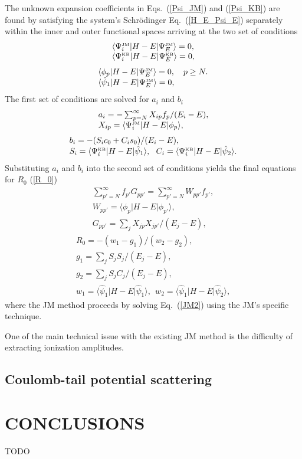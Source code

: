 \documentclass[aip
, pra
, showpacs
, aps
, twocolumn
, groupedaddress
, floatfix
]{revtex4}
\newcommand{\beq}{\begin{equation}}
\newcommand{\eeq}{\end{equation}}
\newcommand{\barr}{\begin{array}}
\newcommand{\earr}{\end{array}}
\newcommand{\JM}{\mbox{\tiny{JM}}}
\newcommand{\KB}{\mbox{\tiny{KB}}}
\begin{document}
The unknown expansion coefficients in Eqs.~(\ref{Psi_JM}) and (\ref{Psi_KB}) 
are found by satisfying the system's  Schr\"odinger Eq.~(\ref{H_E_Psi_E}) 
separately within the inner and outer functional spaces
arriving at the two set of conditions 
\beq \barr{l}
\langle\Psi_i^{\JM}|H-E|\Psi_E^{\JM}\rangle= 0, \\
\langle\Psi_i^{\KB}|H-E|\Psi_E^{\KB}\rangle=0,
\earr \eeq
\beq \barr{l}
\langle\phi_p|H-E|\Psi_E^{\JM}\rangle=0 , \ \ \ p \geq N.\\
\langle \hat{\psi}_1 |H-E|\Psi_E^{\JM}\rangle=0,
\earr \eeq
The first set of conditions are solved for $a_i$ and $b_i$
\beq \barr{l}
a_i = - \sum_{p=N}^{\infty} X_{ip} f_p / (E_i-E),\\
X_{ip}=  \langle\Psi_i^{\JM}|H-E| \phi_p \rangle ,\\
\earr \eeq
\beq \barr{l}
b_i = - (S_i c_0 + C_i s_0) / (E_i-E), \\
S_i = \langle\Psi_i^{\KB}|H-E|  \hat{\psi}_1 \rangle, \ \ 
C_i = \langle\Psi_i^{\KB}|H-E|  \hat{\psi}_2 \rangle.
\earr \eeq
Substituting $a_i$ and $b_i$ into the second set of conditions yields the final equations for $R_0$ (\ref{R_0})
\beq \barr{l}
\sum_{p'=N}^{\infty} f_{p'}  G_{pp'} = \sum_{p'=N}^{\infty} W_{pp'} f_{p'},\\
W_{pp'}  = \langle \phi_p | H-E | \phi_{p'} \rangle,\\
G_{pp'}= \sum_j X_{jp} X_{jp'}/(E_j-E),
\label{JM2} \earr \eeq
\beq \barr{l}
R_0 = -(w_1 - g_1) / (w_2 - g_2),\\
g_1= \sum_j S_{j} S_{j}/(E_j-E),\\
g_2= \sum_j S_{j} C_{j}/(E_j-E),\\
w_1  = \langle \hat{\psi}_1 |H-E| \hat{\psi}_1 \rangle,\ \ 
w_2 = \langle \hat{\psi}_1 |H-E| \hat{\psi}_2 \rangle,
\earr \eeq
where the JM method proceeds by solving Eq.~(\ref{JM2}) using the JM's specific technique. 


One of the main technical issue with the existing JM method is the difficulty of extracting ionization amplitudes. 


\subsection{Coulomb-tail potential scattering}



\section{CONCLUSIONS}
TODO


\begin{acknowledgments}
\end{acknowledgments}





%
\end{document}
